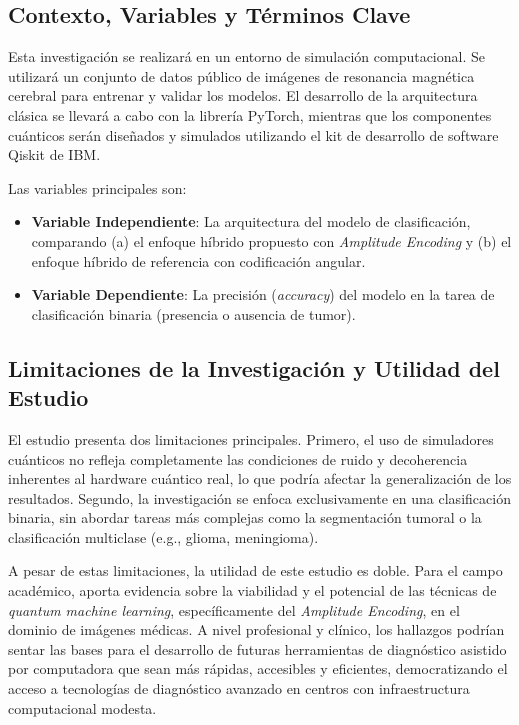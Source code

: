 \subsection*{Contexto, Variables y Términos Clave}

\justify
Esta investigación se realizará en un entorno de simulación computacional. Se utilizará un conjunto de datos público de imágenes de resonancia magnética cerebral para entrenar y validar los modelos. El desarrollo de la arquitectura clásica se llevará a cabo con la librería PyTorch, mientras que los componentes cuánticos serán diseñados y simulados utilizando el kit de desarrollo de software Qiskit de IBM.

Las variables principales son:
\begin{itemize}
    \item \textbf{Variable Independiente}: La arquitectura del modelo de clasificación, comparando (a) el enfoque híbrido propuesto con \textit{Amplitude Encoding} y (b) el enfoque híbrido de referencia con codificación angular.
    \item \textbf{Variable Dependiente}: La precisión (\textit{accuracy}) del modelo en la tarea de clasificación binaria (presencia o ausencia de tumor).
\end{itemize}

\subsection*{Limitaciones de la Investigación y Utilidad del Estudio}

\justify
El estudio presenta dos limitaciones principales. Primero, el uso de simuladores cuánticos no refleja completamente las condiciones de ruido y decoherencia inherentes al hardware cuántico real, lo que podría afectar la generalización de los resultados. Segundo, la investigación se enfoca exclusivamente en una clasificación binaria, sin abordar tareas más complejas como la segmentación tumoral o la clasificación multiclase (e.g., glioma, meningioma).

A pesar de estas limitaciones, la utilidad de este estudio es doble. Para el campo académico, aporta evidencia sobre la viabilidad y el potencial de las técnicas de \textit{quantum machine learning}, específicamente del \textit{Amplitude Encoding}, en el dominio de imágenes médicas. A nivel profesional y clínico, los hallazgos podrían sentar las bases para el desarrollo de futuras herramientas de diagnóstico asistido por computadora que sean más rápidas, accesibles y eficientes, democratizando el acceso a tecnologías de diagnóstico avanzado en centros con infraestructura computacional modesta.


